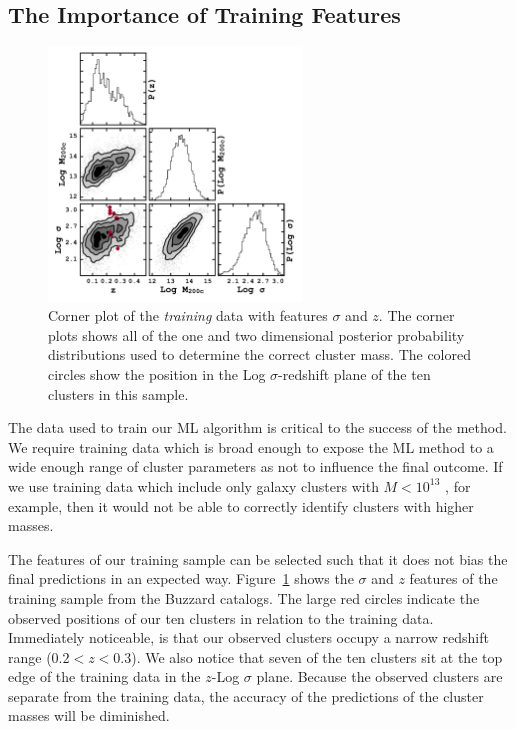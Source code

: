 \subsection{The Importance of Training Features}\label{2sec: training features}
\begin{figure}[t]
	\begin{center}
		\includegraphics[width=0.6\textwidth]{figures2/buzzardCorner.pdf}
	\end{center}
	\caption[Corner plot of the \emph{training} data with features $\sigma$ and $z$.]{Corner plot of the \emph{training} data with features $\sigma$ and $z$. The corner plots shows all of the one and two dimensional posterior probability distributions used to determine the correct cluster mass. The colored circles show the position in the Log $\sigma$-redshift plane of the ten clusters in this sample.}
	\label{2fig:buzzardCorner}
\end{figure}

The data used to train our ML algorithm is critical to the success of the method. We require training data which is broad enough to expose the ML method to a wide enough range of cluster parameters as not to influence the final outcome. If we use training data which include only galaxy clusters with $M < 10^{13}$ \Msol, for example, then it would not be able to correctly identify clusters with higher masses. 

The features of our training sample can be selected such that it does not bias the final predictions in an expected way. Figure~\ref{2fig:buzzardCorner} shows the $\sigma$ and $z$ features of the training sample from the Buzzard catalogs. The large red circles indicate the observed positions of our ten clusters in relation to the training data. Immediately noticeable, is that our observed clusters occupy a narrow redshift range ($0.2< z <0.3$). We also notice that seven of the ten clusters sit at the top edge of the training data in the $z$-Log $\sigma$ plane. Because the observed clusters are separate from the training data, the accuracy of the predictions of the cluster masses will be diminished. 

